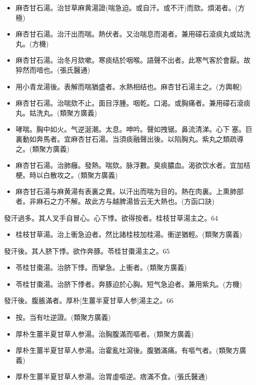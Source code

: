 \documentclass[11pt,oneside,b5paper]{ctexbook}
\begin{document}
\begin{flushleft}
\begin{itemize}
\item 麻杏甘石湯。治甘草麻黄湯證(喘急迫。或自汗。或不汗)而欬。煩渴者。(方極)
\item 麻杏甘石湯。治汗出而喘。熱伏者。又治喘息而渴者。兼用礞石滾痰丸或姑洗丸。(方機)
\item 麻杏甘石湯。治冬月欬嗽。寒痰结於咽喉。語聲不出者。此寒气客於會厭。故猝然而喑也。(張氏醫通)
\item 用小青龙湯後。表解而喘猶盛者。水熱相结也。麻杏甘石湯主之。(方輿輗)
\item 麻杏甘石湯。治喘欬不止。面目浮腫。咽乾。口渴。或胸痛者。兼用礞石滾痰丸。姑洗丸。(類聚方廣義)
\item 哮喘。胸中如火。气逆涎潮。太息。呻吟。聲如拽锯。鼻流清涕。心下{𩊅}塞。巨裏動如奔馬者。宜麻杏甘石湯。当須痰融聲出後。以陷胸丸。紫丸之類疏導之。(類聚方廣義)
\item 麻杏甘石湯。治肺癰。發熱。喘欬。脉浮數。臭痰膿血。渴欲饮水者。宜加桔梗。時以白散攻之。(類聚方廣義)
\item 麻杏甘石湯与麻黄湯有表裏之異。以汗出而喘为目的。熱在肉裏。上熏肺部者。非麻石之力不解。故此方与越脾湯皆云无大熱也。(方函口訣)
\end{itemize}

發汗過多。其人叉手自冒心。心下悸。欲得按者。桂枝甘草湯主之。64

\begin{itemize}
\item 桂枝甘草湯。治上衝急迫者。然比諸桂枝加桂湯。衝逆猶輕。(類聚方廣義)
\end{itemize}

發汗後。其人脐下悸。欲作奔豚。苓桂甘棗湯主之。65

\begin{itemize}
\item 苓桂甘棗湯。治脐下悸。而攣急。上衝者。(類聚方廣義)
\item 苓桂甘棗湯。治脐下悸者。奔豚迫於心胸。短气急迫者。兼用紫丸。(方機)
\end{itemize}

發汗後。腹脹滿者。厚朴[生薑半夏甘草人参]湯主之。66

\begin{itemize}
\item 按。当有吐逆證。(類聚方廣義)
\item 厚朴生薑半夏甘草人参湯。治胸腹滿而嘔者。(類聚方廣義)
\item 厚朴生薑半夏甘草人参湯。治霍亂吐瀉後。腹猶滿痛。有嘔气者。(類聚方廣義)
\item 厚朴生薑半夏甘草人参湯。治胃虛嘔逆。痞滿不食。(張氏醫通)
\end{itemize}


\end{flushleft}
\end{document}
